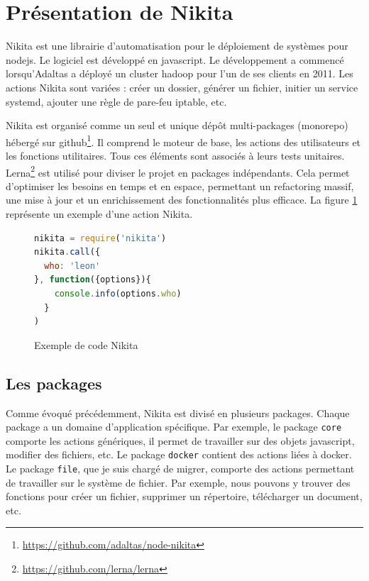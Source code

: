 \documentclass[12pt, french]{report}
\begin{document}
\section{Présentation de Nikita}

Nikita est une librairie d’automatisation pour le déploiement de systèmes pour \gls{nodejs}. Le logiciel est développé en \gls{javascript}. Le développement a commencé lorsqu'Adaltas a déployé un cluster \gls{hadoop} pour l’un de ses clients en 2011. Les actions Nikita sont variées : créer un dossier, générer un fichier, initier un service systemd, ajouter une règle de pare-feu iptable, etc.

Nikita est organisé comme un seul et unique dépôt multi-packages (monorepo) hébergé sur \gls{github}\footnote{\href{https://github.com/adaltas/node-nikita}{https://github.com/adaltas/node-nikita}}. Il comprend le moteur de base, les actions des utilisateurs et les fonctions utilitaires. Tous ces éléments sont associés à leurs tests unitaires. Lerna\footnote{\href{https://github.com/lerna/lerna}{https://github.com/lerna/lerna}} est utilisé pour diviser le projet en packages indépendants. Cela permet d'optimiser les besoins en temps et en espace, permettant un refactoring massif, une mise à jour et un enrichissement des fonctionnalités plus efficace. La figure \ref{code:example} représente un exemple d'une action Nikita.

\begin{figure}[H]
\begin{lstlisting}[language=JavaScript]
nikita = require('nikita')
nikita.call({
  who: 'leon'
}, function({options}){
    console.info(options.who)
  }
)
\end{lstlisting}
\centering
\caption{Exemple de code Nikita}
\label{code:example}
\end{figure}

\subsection{Les packages}

Comme évoqué précédemment, Nikita est divisé en plusieurs packages. Chaque package a un domaine d'application spécifique. Par exemple, le package \texttt{core} comporte les actions génériques, il permet de travailler sur des objets \gls{javascript}, modifier des fichiers, etc. Le package \texttt{docker} contient des actions liées à \gls{docker}. Le package \texttt{file}, que je suis chargé de migrer, comporte des actions permettant de travailler sur le système de fichier. Par exemple, nous pouvons y trouver des fonctions pour créer un fichier, supprimer un répertoire, télécharger un document, etc.
\end{document}
